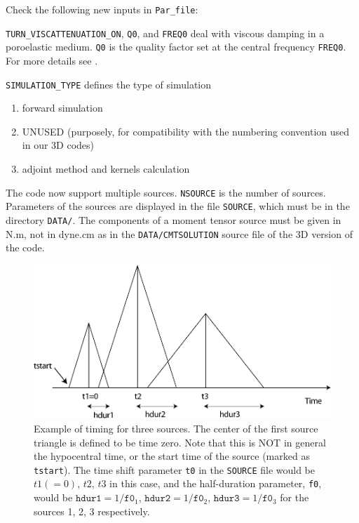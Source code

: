 \documentclass[oneside,english,onecolumn,letterpaper]{book}
\begin{document}
Check the following new inputs in \texttt{Par\_file}:
%
\begin{description}[style=nextline, labelindent=1em, font=\normalfont]
\item[In section \textbf{"\# geometry of model and mesh description"}:]
\texttt{TURN\_VISCATTENUATION\_ON}, \texttt{Q0}, and \texttt{FREQ0} deal with viscous damping in a poroelastic medium.
\texttt{Q0} is the quality factor set at the central frequency \texttt{FREQ0}. For more details
see \cite{MoTr08}.

\item[In section \textbf{"\# time step parameters"}:]
\texttt{SIMULATION\_TYPE} defines the type of simulation
  \begin{enumerate}[label=(\arabic*)]
    \item forward simulation
    \item UNUSED (purposely, for compatibility with the numbering convention used in our 3D codes)
    \item adjoint method and kernels calculation
  \end{enumerate}

\item[In section \textbf{"\# source parameters"}:]
The code now support multiple sources.
\texttt{NSOURCE} is the number of sources.
Parameters of the sources are displayed in the file \texttt{SOURCE}, which must be
in the directory \texttt{DATA/}. The components of a moment tensor source must be given in N.m,
not in dyne.cm as in the \texttt{DATA/CMTSOLUTION} source file of the 3D version of the code.
\begin{figure}[htbp]
\centering
\includegraphics[width=5in]{figures/source_timing.pdf}
\caption{Example of timing for three sources. The center of the first source
triangle is defined to be time zero. Note that this is NOT in general
the hypocentral time, or the start time of the source (marked as \texttt{tstart}).
The time shift parameter \texttt{t0} in the \texttt{SOURCE} file
would be $t1(=0)$, $t2$, $t3$ in this case, and the half-duration parameter, \texttt{f0},
would be $\mathtt{hdur1}=1/\mathtt{f0}_1$, $\mathtt{hdur2}=1/\mathtt{f0}_2$,
$\mathtt{hdur3}=1/\mathtt{f0}_3$ for the sources 1, 2, 3 respectively.}
\label{fig:source_timing}
\end{figure}



\end{description}
\end{document}
